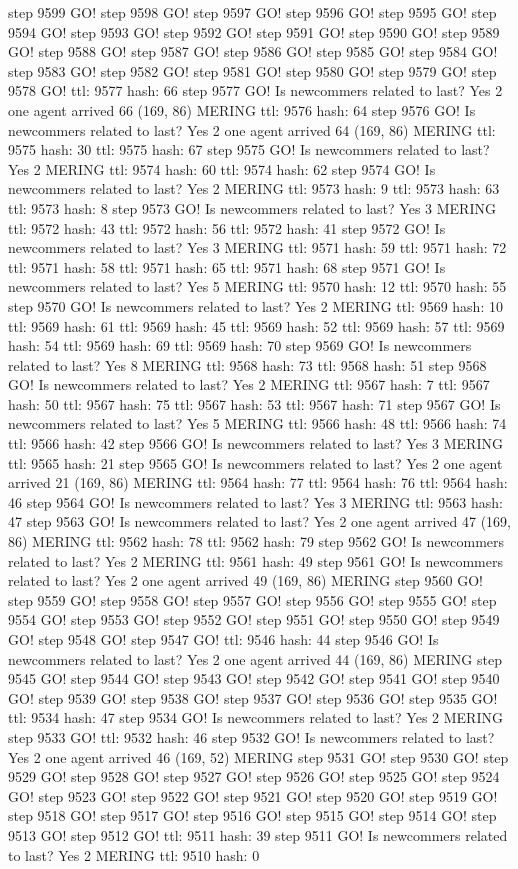 step 9599 GO! step 9598 GO! step 9597 GO! step 9596 GO! step 9595 GO! step 9594 GO! step 9593 GO! step 9592 GO! step 9591 GO! step 9590 GO! step 9589 GO! step 9588 GO! step 9587 GO! step 9586 GO! step 9585 GO! step 9584 GO! step 9583 GO! step 9582 GO! step 9581 GO! step 9580 GO! step 9579 GO! step 9578 GO! ttl: 9577 hash: 66 step 9577 GO! Is newcommers related to last? Yes 2 one agent arrived 66 (169, 86) MERING ttl: 9576 hash: 64 step 9576 GO! Is newcommers related to last? Yes 2 one agent arrived 64 (169, 86) MERING ttl: 9575 hash: 30 ttl: 9575 hash: 67 step 9575 GO! Is newcommers related to last? Yes 2 MERING ttl: 9574 hash: 60 ttl: 9574 hash: 62 step 9574 GO! Is newcommers related to last? Yes 2 MERING ttl: 9573 hash: 9 ttl: 9573 hash: 63 ttl: 9573 hash: 8 step 9573 GO! Is newcommers related to last? Yes 3 MERING ttl: 9572 hash: 43 ttl: 9572 hash: 56 ttl: 9572 hash: 41 step 9572 GO! Is newcommers related to last? Yes 3 MERING ttl: 9571 hash: 59 ttl: 9571 hash: 72 ttl: 9571 hash: 58 ttl: 9571 hash: 65 ttl: 9571 hash: 68 step 9571 GO! Is newcommers related to last? Yes 5 MERING ttl: 9570 hash: 12 ttl: 9570 hash: 55 step 9570 GO! Is newcommers related to last? Yes 2 MERING ttl: 9569 hash: 10 ttl: 9569 hash: 61 ttl: 9569 hash: 45 ttl: 9569 hash: 52 ttl: 9569 hash: 57 ttl: 9569 hash: 54 ttl: 9569 hash: 69 ttl: 9569 hash: 70 step 9569 GO! Is newcommers related to last? Yes 8 MERING ttl: 9568 hash: 73 ttl: 9568 hash: 51 step 9568 GO! Is newcommers related to last? Yes 2 MERING ttl: 9567 hash: 7 ttl: 9567 hash: 50 ttl: 9567 hash: 75 ttl: 9567 hash: 53 ttl: 9567 hash: 71 step 9567 GO! Is newcommers related to last? Yes 5 MERING ttl: 9566 hash: 48 ttl: 9566 hash: 74 ttl: 9566 hash: 42 step 9566 GO! Is newcommers related to last? Yes 3 MERING ttl: 9565 hash: 21 step 9565 GO! Is newcommers related to last? Yes 2 one agent arrived 21 (169, 86) MERING ttl: 9564 hash: 77 ttl: 9564 hash: 76 ttl: 9564 hash: 46 step 9564 GO! Is newcommers related to last? Yes 3 MERING ttl: 9563 hash: 47 step 9563 GO! Is newcommers related to last? Yes 2 one agent arrived 47 (169, 86) MERING ttl: 9562 hash: 78 ttl: 9562 hash: 79 step 9562 GO! Is newcommers related to last? Yes 2 MERING ttl: 9561 hash: 49 step 9561 GO! Is newcommers related to last? Yes 2 one agent arrived 49 (169, 86) MERING step 9560 GO! step 9559 GO! step 9558 GO! step 9557 GO! step 9556 GO! step 9555 GO! step 9554 GO! step 9553 GO! step 9552 GO! step 9551 GO! step 9550 GO! step 9549 GO! step 9548 GO! step 9547 GO! ttl: 9546 hash: 44 step 9546 GO! Is newcommers related to last? Yes 2 one agent arrived 44 (169, 86) MERING step 9545 GO! step 9544 GO! step 9543 GO! step 9542 GO! step 9541 GO! step 9540 GO! step 9539 GO! step 9538 GO! step 9537 GO! step 9536 GO! step 9535 GO! ttl: 9534 hash: 47 step 9534 GO! Is newcommers related to last? Yes 2 MERING step 9533 GO! ttl: 9532 hash: 46 step 9532 GO! Is newcommers related to last? Yes 2 one agent arrived 46 (169, 52) MERING step 9531 GO! step 9530 GO! step 9529 GO! step 9528 GO! step 9527 GO! step 9526 GO! step 9525 GO! step 9524 GO! step 9523 GO! step 9522 GO! step 9521 GO! step 9520 GO! step 9519 GO! step 9518 GO! step 9517 GO! step 9516 GO! step 9515 GO! step 9514 GO! step 9513 GO! step 9512 GO! ttl: 9511 hash: 39 step 9511 GO! Is newcommers related to last? Yes 2 MERING ttl: 9510 hash: 0 